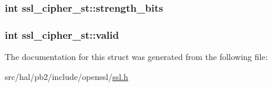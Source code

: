 \subsubsection[{\texorpdfstring{strength\+\_\+bits}{strength_bits}}]{\setlength{\rightskip}{0pt plus 5cm}int ssl\+\_\+cipher\+\_\+st\+::strength\+\_\+bits}\hypertarget{structssl__cipher__st_ae3a40fb67452514df7770e334a99c32d}{}\label{structssl__cipher__st_ae3a40fb67452514df7770e334a99c32d}
\subsubsection[{\texorpdfstring{valid}{valid}}]{\setlength{\rightskip}{0pt plus 5cm}int ssl\+\_\+cipher\+\_\+st\+::valid}\hypertarget{structssl__cipher__st_aaf30c2f1483a5dfcf39a507efb2bacf7}{}\label{structssl__cipher__st_aaf30c2f1483a5dfcf39a507efb2bacf7}


The documentation for this struct was generated from the following file\+:\begin{DoxyCompactItemize}
\item 
src/hal/pb2/include/openssl/\hyperlink{ssl_8h}{ssl.\+h}\end{DoxyCompactItemize}
